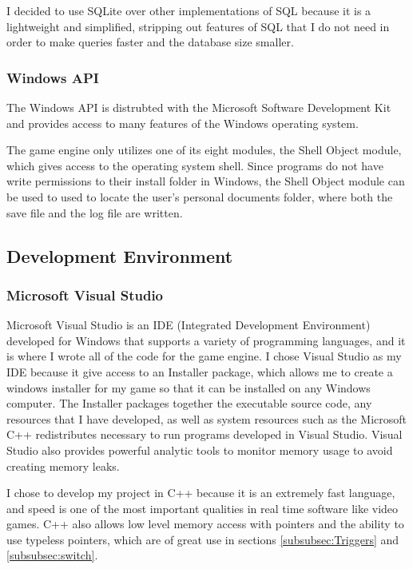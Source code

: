 \documentclass{article}
\begin{document}
I decided to use SQLite over other implementations of SQL because it is a lightweight and simplified, stripping out features of SQL that I do not need in order to make queries faster and the database size smaller.

\subsubsection{Windows API} \label{subsubsec:SHLOBJ}

The Windows API is distrubted with the Microsoft Software Development Kit and provides access to many features of the Windows operating system.

The game engine only utilizes one of its eight modules, the Shell Object module, which gives access to the operating system shell. Since programs do not have write permissions to their install folder in Windows, the Shell Object module can be used to used to locate the user's personal documents folder, where both the save file and the log file are written.

\subsection{Development Environment} \label{subsec:DevelopmentEnvironment}

\subsubsection{Microsoft Visual Studio} \label{subsubsec:MVS}

Microsoft Visual Studio is an IDE (Integrated Development Environment) developed for Windows that supports a variety of programming languages, and it is where I wrote all of the code for the game engine. I chose Visual Studio as my IDE because it give access to an Installer package, which allows me to create a windows installer for my game so that it can be installed on any Windows computer. The Installer packages together the executable source code, any resources that I have developed, as well as system resources such as the Microsoft C++ redistributes necessary to run programs developed in Visual Studio. Visual Studio also provides powerful analytic tools to monitor memory usage to avoid creating memory leaks.

I chose to develop my project in C++ because it is an extremely fast language, and speed is one of the most important qualities in real time software like video games. C++ also allows low level memory access with pointers and the ability to use typeless pointers, which are of great use in sections \ref{subsubsec:Triggers} and \ref{subsubsec:switch}.
\end{document}
